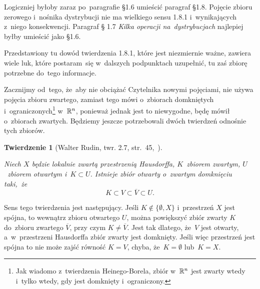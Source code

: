 \documentclass[a4paper,11pt]{article}
\numberwithin{equation}{section}
\newtheorem{theorem}{Twierdzenie}
\begin{document}
\VerSpaceFour




\noindent
{} Logiczniej byłoby zaraz po~paragrafie \S 1.6 umieścić
paragraf \S 1.8. Pojęcie zbioru zerowego i~nośnika dystrybucji nie ma
wielkiego sensu 1.8.1 i~wynikających z~niego konsekwencji. Paragraf \S
1.7 \textit{Kilka operacji na~dystrybucjach} najlepiej byłby umieścić
jako \S 1.6.

\VerSpaceFour





\noindent
{} Przedstawiony tu dowód twierdzenia 1.8.1, które
jest niezmiernie ważne, zawiera wiele luk, które postaram~się
w~dalszych podpunktach uzupełnić, tu zaś zbiorę potrzebne do~tego
informacje.

Zacznijmy od~tego, że~aby nie obciążać Czytelnika nowymi pojęciami,
nie używa pojęcia zbioru zwartego, zamiast tego mówi o~zbiorach
domkniętych i~ograniczonych\footnote{Jak wiadomo z~twierdzenia
  Heinego-Borela, zbiór w~$\mathbb{R}^{ n }$ jest zwarty wtedy i~tylko
  wtedy, gdy jest domknięty i~ograniczony.} w~$\mathbb{R}^{ n }$, ponieważ jednak
jest to niewygodne, będę mówił o~zbiorach zwartych. Będziemy jeszcze
potrzebowali dwóch twierdzeń odnośnie tych zbiorów.





\begin{theorem}[Walter Rudin, twr. 2.7,
  str.~45,~\cite{RudinAnalizaRzeczywistaIZespolona1998}]
  \label{thm:Zemanian-01}

  Niech $X$ będzie lokalnie zwartą przestrzenią Hausdorffa,
  $K$~zbiorem zwartym, $U$~zbiorem otwartym i~$K \subset U$. Istnieje
  zbiór otwarty o~zwartym domknięciu taki,~że
  \begin{equation}
    \label{eq:Zemanian-04}
    K \subset V \subset \overline{ V } \subset U.
  \end{equation}

\end{theorem}





Sens tego twierdzenia jest następujący. Jeśli $K \notin \{ \emptyset, X \}$
i~przestrzeń $X$ jest spójna, to wewnątrz zbioru otwartego $U$, można
powiększyć zbiór zwarty $K$ do~zbioru zwartego $\overline{ V }$, przy czym
$K \neq \overline{ V }$. Jest tak dlatego, że~$V$ jest otwarty,
a~w~przestrzeni Hausdorffa zbiór zwarty jest domknięty. Jeśli więc
przestrzeń jest spójna to nie może zajść równość $K = V$, chyba,
że~$K = \emptyset$ lub~$K = X$.
\end{document}

